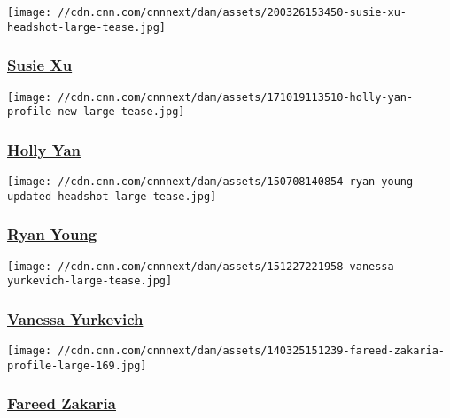 \href{/profiles/susie-xu-profile}{}

\texttt{[image: //cdn.cnn.com/cnnnext/dam/assets/200326153450-susie-xu-headshot-large-tease.jpg]}

\hypertarget{susie-xu}{%
\subsubsection{\texorpdfstring{\href{/profiles/susie-xu-profile}{Susie
Xu}}{Susie Xu}}\label{susie-xu}}

\href{/profiles/holly-yan}{}

\texttt{[image: //cdn.cnn.com/cnnnext/dam/assets/171019113510-holly-yan-profile-new-large-tease.jpg]}

\hypertarget{holly-yan}{%
\subsubsection{\texorpdfstring{\href{/profiles/holly-yan}{Holly
Yan}}{Holly Yan}}\label{holly-yan}}

\href{/profiles/ryan-young-profile}{}

\texttt{[image: //cdn.cnn.com/cnnnext/dam/assets/150708140854-ryan-young-updated-headshot-large-tease.jpg]}

\hypertarget{ryan-young}{%
\subsubsection{\texorpdfstring{\href{/profiles/ryan-young-profile}{Ryan
Young}}{Ryan Young}}\label{ryan-young}}

\href{/profiles/vanessa-yurkevich}{}

\texttt{[image: //cdn.cnn.com/cnnnext/dam/assets/151227221958-vanessa-yurkevich-large-tease.jpg]}

\hypertarget{vanessa-yurkevich}{%
\subsubsection{\texorpdfstring{\href{/profiles/vanessa-yurkevich}{Vanessa
Yurkevich}}{Vanessa Yurkevich}}\label{vanessa-yurkevich}}

\href{/profiles/fareed-zakaria-profile}{}

\texttt{[image: //cdn.cnn.com/cnnnext/dam/assets/140325151239-fareed-zakaria-profile-large-169.jpg]}

\hypertarget{fareed-zakaria}{%
\subsubsection{\texorpdfstring{\href{/profiles/fareed-zakaria-profile}{Fareed
Zakaria}}{Fareed Zakaria}}\label{fareed-zakaria}}

